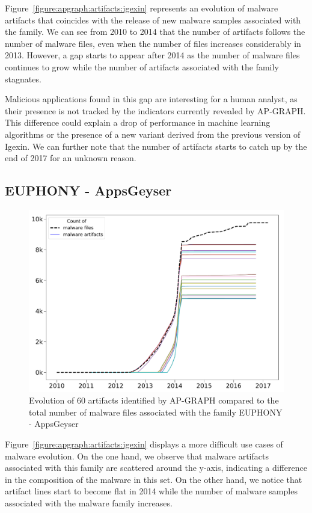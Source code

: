 Figure~\ref{figure:apgraph:artifacts:igexin} represents an evolution of malware artifacts that coincides with the release of new malware samples associated with the family.
We can see from 2010 to 2014 that the number of artifacts follows the number of malware files, even when the number of files increases considerably in 2013.
However, a gap starts to appear after 2014 as the number of malware files continues to grow while the number of artifacts associated with the family stagnates.

Malicious applications found in this gap are interesting for a human analyst, as their presence is not tracked by the indicators currently revealed by AP-GRAPH.
This difference could explain a drop of performance in machine learning algorithms or the presence of a new variant derived from the previous version of Igexin.
We can further note that the number of artifacts starts to catch up by the end of 2017 for an unknown reason.
\subsection{EUPHONY - AppsGeyser}

\begin{figure}[!ht]
        \centering
	\includegraphics[width=0.85\linewidth]{figures/apgraph/artifacts/euphony_appsgeyser.pdf}
        \caption[Evolution of artifacts identified by AP-GRAPH for EUPHONY - AppsGeyser]{Evolution of 60 artifacts identified by AP-GRAPH compared to the total number of malware files associated with the family EUPHONY - AppsGeyser}
	\label{figure:apgraph:artifacts:appsgeyser}
\end{figure}

Figure~\ref{figure:apgraph:artifacts:igexin} displays a more difficult use cases of malware evolution.
On the one hand, we observe that malware artifacts associated with this family are scattered around the y-axis, indicating a difference in the composition of the malware in this set.
On the other hand, we notice that artifact lines start to become flat in 2014 while the number of malware samples associated with the malware family increases.


